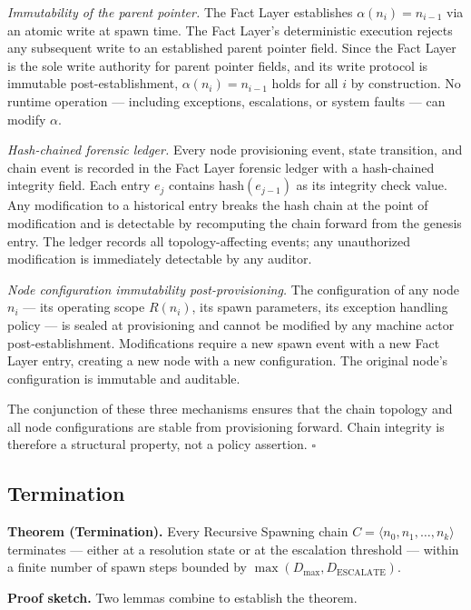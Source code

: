 \medskip
\textit{Immutability of the parent pointer.} The Fact Layer establishes $\alpha(n_i) = n_{i-1}$ via an atomic write at spawn time. The Fact Layer's deterministic execution rejects any subsequent write to an established parent pointer field. Since the Fact Layer is the sole write authority for parent pointer fields, and its write protocol is immutable post-establishment, $\alpha(n_i) = n_{i-1}$ holds for all $i$ by construction. No runtime operation — including exceptions, escalations, or system faults — can modify $\alpha$.

\medskip
\textit{Hash-chained forensic ledger.} Every node provisioning event, state transition, and chain event is recorded in the Fact Layer forensic ledger with a hash-chained integrity field. Each entry $e_j$ contains $\text{hash}(e_{j-1})$ as its integrity check value. Any modification to a historical entry breaks the hash chain at the point of modification and is detectable by recomputing the chain forward from the genesis entry. The ledger records all topology-affecting events; any unauthorized modification is immediately detectable by any auditor.

\medskip
\textit{Node configuration immutability post-provisioning.} The configuration of any node $n_i$ — its operating scope $R(n_i)$, its spawn parameters, its exception handling policy — is sealed at provisioning and cannot be modified by any machine actor post-establishment. Modifications require a new spawn event with a new Fact Layer entry, creating a new node with a new configuration. The original node's configuration is immutable and auditable.

The conjunction of these three mechanisms ensures that the chain topology and all node configurations are stable from provisioning forward. Chain integrity is therefore a structural property, not a policy assertion. $\square$

\subsection{Termination}
\label{sec:rs-termination}

\medskip
\noindent\textbf{Theorem (Termination).} Every Recursive Spawning chain $C = \langle n_0, n_1, \ldots, n_k \rangle$ terminates — either at a resolution state or at the escalation threshold — within a finite number of spawn steps bounded by $\max(D_{\max}, D_{\mathrm{ESCALATE}})$.

\medskip
\noindent\textbf{Proof sketch.} Two lemmas combine to establish the theorem.

